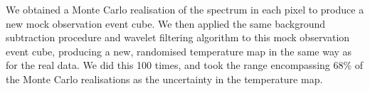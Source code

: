 \documentclass[twocolumn,traditabstract]{aa}
\newcommand{\ccor}[1]{\textcolor{Mypink}{#1}}
\begin{document}
\ccor{We obtained a Monte Carlo realisation of the spectrum in each pixel to produce a new mock observation event cube. We then applied the same background subtraction procedure and wavelet filtering algorithm to this mock observation event cube, producing a new, randomised temperature map in the same way as for the real data. We did this 100 times, and took the range encompassing 68\% of the Monte Carlo realisations as the uncertainty in the temperature map.}
%
%
%
%
%
%
%
%
\end{document}
